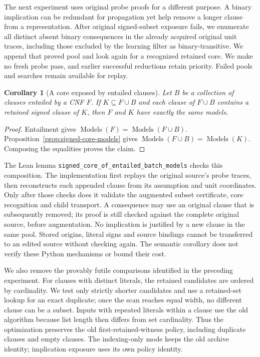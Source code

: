 \documentclass[11pt,a4paper]{article}
\numberwithin{equation}{section}
\theoremstyle{plain}
\newtheorem{corollary}[lemma]{Corollary}
\theoremstyle{definition}
\theoremstyle{remark}
\begin{document}
The next experiment uses original probe proofs for a different purpose. A binary implication can be redundant for propagation yet help remove a longer clause from a representation. After original signed-subset exposure fails, we enumerate all distinct absent binary consequences in the already acquired original unit traces, including those excluded by the learning filter as binary-transitive. We append that proved pool and look again for a recognized retained core. We make no fresh probe pass, and earlier successful reductions retain priority. Failed pools and searches remain available for replay.

\begin{corollary}[A core exposed by entailed clauses]
\label{cor:entailed-signed-core}
Let $B$ be a collection of clauses entailed by a CNF $F$. If $K\subseteq F\cup B$ and each clause of $F\cup B$ contains a retained signed clause of $K$, then $F$ and $K$ have exactly the same models.
\end{corollary}
\begin{proof}
Entailment gives $\operatorname{Models}(F)=\operatorname{Models}(F\cup B)$. Proposition~\ref{prop:signed-core-models} gives $\operatorname{Models}(F\cup B)=\operatorname{Models}(K)$. Composing the equalities proves the claim.
\end{proof}

The Lean lemma \texttt{signed\_core\_of\_entailed\_batch\_models} checks this composition. The implementation first replays the original source's probe traces, then reconstructs each appended clause from its assumption and unit coordinates. Only after those checks does it validate the augmented subset certificate, core recognition and child transport. A consequence may use an original clause that is subsequently removed; its proof is still checked against the complete original source, before augmentation. No implication is justified by a new clause in the same pool. Stored origins, literal signs and source bindings cannot be transferred to an edited source without checking again. The semantic corollary does not verify these Python mechanisms or bound their cost.

We also remove the provably futile comparisons identified in the preceding experiment. For clauses with distinct literals, the retained candidates are ordered by cardinality. We test only strictly shorter candidates and use a retained-set lookup for an exact duplicate; once the scan reaches equal width, no different clause can be a subset. Inputs with repeated literals within a clause use the old algorithm because list length then differs from set cardinality. Thus the optimization preserves the old first-retained-witness policy, including duplicate clauses and empty clauses. The indexing-only mode keeps the old archive identity; implication exposure uses its own policy identity.
\end{document}
